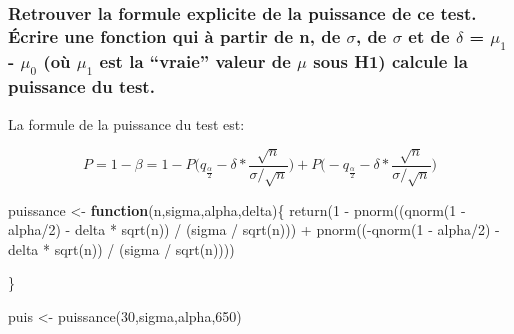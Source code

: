 \documentclass[
]{article}
\newenvironment{Shaded}{\begin{snugshade}}{\end{snugshade}}
\newcommand{\ControlFlowTok}[1]{\textcolor[rgb]{0.13,0.29,0.53}{\textbf{#1}}}
\newcommand{\DecValTok}[1]{\textcolor[rgb]{0.00,0.00,0.81}{#1}}
\newcommand{\FunctionTok}[1]{\textcolor[rgb]{0.00,0.00,0.00}{#1}}
\newcommand{\NormalTok}[1]{#1}
\newcommand{\OtherTok}[1]{\textcolor[rgb]{0.56,0.35,0.01}{#1}}
\newcommand{\SpecialCharTok}[1]{\textcolor[rgb]{0.00,0.00,0.00}{#1}}
\begin{document}
\hypertarget{retrouver-la-formule-explicite-de-la-puissance-de-ce-test.-uxe9crire-une-fonction-qui-uxe0-partir-de-n-de-sigma-de-sigma-et-de-delta-mu_1---mu_0-ouxf9-mu_1-est-la-vraie-valeur-de-mu-sous-h1-calcule-la-puissance-du-test.}{%
\subsubsection{\texorpdfstring{Retrouver la formule explicite de la
puissance de ce test. Écrire une fonction qui à partir de n, de
\(\sigma\), de \(\sigma\) et de \(\delta\) = \(\mu_1\) - \(\mu_0\) (où
\(\mu_1\) est la ``vraie'' valeur de \(\mu\) sous H1) calcule la
puissance du
test.}{Retrouver la formule explicite de la puissance de ce test. Écrire une fonction qui à partir de n, de \textbackslash sigma, de \textbackslash sigma et de \textbackslash delta = \textbackslash mu\_1 - \textbackslash mu\_0 (où \textbackslash mu\_1 est la ``vraie'' valeur de \textbackslash mu sous H1) calcule la puissance du test.}}\label{retrouver-la-formule-explicite-de-la-puissance-de-ce-test.-uxe9crire-une-fonction-qui-uxe0-partir-de-n-de-sigma-de-sigma-et-de-delta-mu_1---mu_0-ouxf9-mu_1-est-la-vraie-valeur-de-mu-sous-h1-calcule-la-puissance-du-test.}}

La formule de la puissance du test est:

\[P=1-\beta=1-P\bigg(q_\frac{\alpha}{2}-\delta*\frac{\sqrt{n}}{\sigma/\sqrt{n}}\bigg)+P\bigg(-q_\frac{\alpha}{2}-\delta*\frac{\sqrt{n}}{\sigma/\sqrt{n}}\bigg)\]

\begin{Shaded}
\begin{Highlighting}[]
\NormalTok{puissance }\OtherTok{\textless{}{-}} \ControlFlowTok{function}\NormalTok{(n,sigma,alpha,delta)\{}
  \FunctionTok{return}\NormalTok{(}\DecValTok{1} \SpecialCharTok{{-}} \FunctionTok{pnorm}\NormalTok{((}\FunctionTok{qnorm}\NormalTok{(}\DecValTok{1} \SpecialCharTok{{-}}\NormalTok{ alpha}\SpecialCharTok{/}\DecValTok{2}\NormalTok{) }\SpecialCharTok{{-}}\NormalTok{ delta }\SpecialCharTok{*} \FunctionTok{sqrt}\NormalTok{(n)) }\SpecialCharTok{/}\NormalTok{ (sigma }\SpecialCharTok{/} \FunctionTok{sqrt}\NormalTok{(n))) }\SpecialCharTok{+} \FunctionTok{pnorm}\NormalTok{((}\SpecialCharTok{{-}}\FunctionTok{qnorm}\NormalTok{(}\DecValTok{1} \SpecialCharTok{{-}}\NormalTok{ alpha}\SpecialCharTok{/}\DecValTok{2}\NormalTok{) }\SpecialCharTok{{-}}\NormalTok{ delta }\SpecialCharTok{*} \FunctionTok{sqrt}\NormalTok{(n)) }\SpecialCharTok{/}\NormalTok{ (sigma }\SpecialCharTok{/} \FunctionTok{sqrt}\NormalTok{(n))))}
  
\NormalTok{\}}

\NormalTok{puis }\OtherTok{\textless{}{-}} \FunctionTok{puissance}\NormalTok{(}\DecValTok{30}\NormalTok{,sigma,alpha,}\DecValTok{650}\NormalTok{)}
\end{Highlighting}
\end{Shaded}
\end{document}
